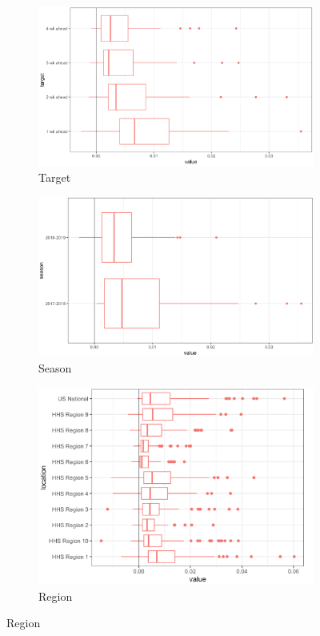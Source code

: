 \documentclass{umassthesis}          %
\begin{document}
\begin{figure}
   \begin{subfigure}{.5\textwidth}
  \centering
\includegraphics[scale=.15]{target_chap2.png}
 \caption{Target}
\end{subfigure}%
\begin{subfigure}{.5\textwidth}
  \centering
    \includegraphics[scale=.2]{season.png}
    \caption{Season}
\end{subfigure}
\centering
\begin{subfigure}{.5\textwidth}
  \centering
    \includegraphics[scale=.3]{region.png}
    \caption{Region}
\end{subfigure}

\label{fig:model_results}
\end{figure}
\end{document}
